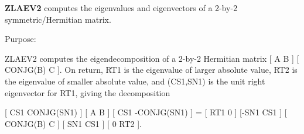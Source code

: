 {\bfseries Z\+L\+A\+E\+V2} computes the eigenvalues and eigenvectors of a 2-\/by-\/2 symmetric/\+Hermitian matrix. 

 \begin{DoxyParagraph}{Purpose\+: }
\begin{DoxyVerb} ZLAEV2 computes the eigendecomposition of a 2-by-2 Hermitian matrix
    [  A         B  ]
    [  CONJG(B)  C  ].
 On return, RT1 is the eigenvalue of larger absolute value, RT2 is the
 eigenvalue of smaller absolute value, and (CS1,SN1) is the unit right
 eigenvector for RT1, giving the decomposition

 [ CS1  CONJG(SN1) ] [    A     B ] [ CS1 -CONJG(SN1) ] = [ RT1  0  ]
 [-SN1     CS1     ] [ CONJG(B) C ] [ SN1     CS1     ]   [  0  RT2 ].\end{DoxyVerb}
 
\end{DoxyParagraph}

